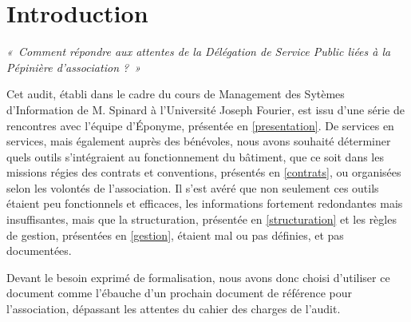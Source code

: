 \section*{Introduction}

\textit{«~Comment répondre aux attentes de la Délégation de Service Public liées à la Pépinière d'association ?~»}

Cet audit, établi dans le cadre du cours de Management des Sytèmes d'Information de M. Spinard à l'Université Joseph Fourier, est issu d'une série de rencontres avec l'équipe d'Éponyme, présentée en \ref{presentation}. De services en services, mais également auprès des bénévoles, nous avons souhaité déterminer quels outils s'intégraient au fonctionnement du bâtiment, que ce soit dans les missions régies des contrats et conventions, présentés en \ref{contrats}, ou organisées selon les volontés de l'association. Il s'est avéré que non seulement ces outils étaient peu fonctionnels et efficaces, les informations fortement redondantes mais insuffisantes, mais que la structuration, présentée en \ref{structuration} et les règles de gestion, présentées en \ref{gestion}, étaient mal ou pas définies, et pas documentées.

Devant le besoin exprimé de formalisation, nous avons donc choisi d'utiliser ce document comme l'ébauche d'un prochain document de référence pour l'association, dépassant les attentes du cahier des charges de l'audit.